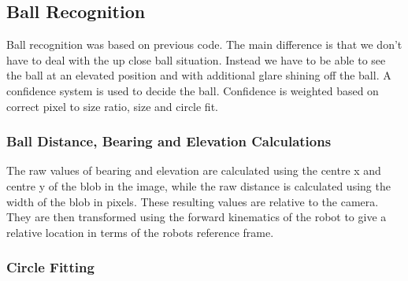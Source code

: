 \subsection{Ball Recognition}

Ball recognition was based on previous code. The main difference is that we don't have to deal with the up close ball situation. Instead we have to be able to see the ball at an elevated position and with additional glare shining off the ball. A confidence system is used to decide the ball. Confidence is weighted based on correct pixel to size ratio, size and circle fit.

\subsubsection{Ball Distance, Bearing and Elevation Calculations}
The raw values of bearing and elevation are calculated using the centre x and centre y of the blob in the image, while the raw
distance is calculated using the width of the blob in pixels. These resulting values are relative to the camera. They are then transformed using the forward kinematics of the robot to give a relative location in terms of the robots reference frame.

\subsubsection{Circle Fitting}

